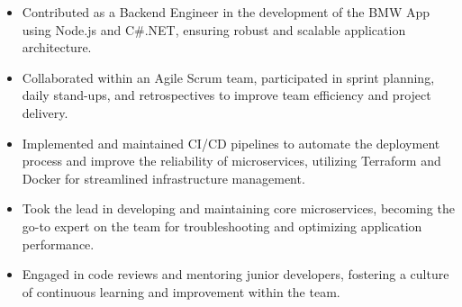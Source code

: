 \documentclass[10pt,a4paper,photo]{altacv}
\begin{document}


\begin{fullwidth}
\makecvheader
\end{fullwidth}







\begin{itemize}
\item Contributed as a Backend Engineer in the development of the BMW App using Node.js and C\#.NET, ensuring robust and scalable application architecture.
\item Collaborated within an Agile Scrum team, participated in sprint planning, daily stand-ups, and retrospectives to improve team efficiency and project delivery.
\item Implemented and maintained CI/CD pipelines to automate the deployment process and improve the reliability of microservices, utilizing Terraform and Docker for streamlined infrastructure management.
\item Took the lead in developing and maintaining core microservices, becoming the go-to expert on the team for troubleshooting and optimizing application performance.
\item Engaged in code reviews and mentoring junior developers, fostering a culture of continuous learning and improvement within the team.
\end{itemize}
\divider
\end{document}
